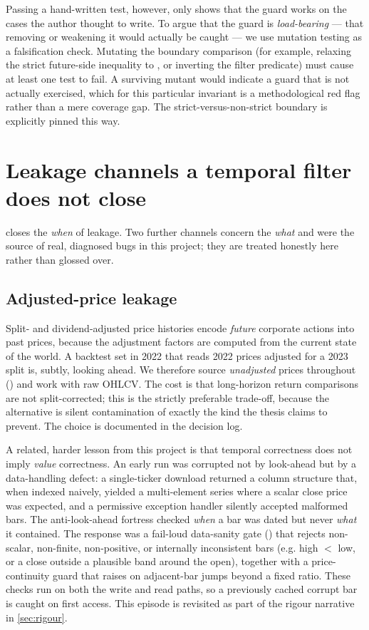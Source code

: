 Passing a hand-written test, however, only shows that the guard works on the cases the
author thought to write. To argue that the guard is \emph{load-bearing} --- that removing or
weakening it would actually be caught --- we use mutation testing as a falsification check.
Mutating the boundary comparison (for example, relaxing the strict future-side inequality
\code{>} to \code{>=}, or inverting the filter predicate) must cause at least one test to
fail. A surviving mutant would indicate a guard that is not actually exercised, which for
this particular invariant is a methodological red flag rather than a mere coverage gap. The
strict-versus-non-strict boundary is explicitly pinned this way.

\section{Leakage channels a temporal filter does not close}
\label{sec:leakage}

 closes the \emph{when} of leakage. Two further channels concern the
\emph{what} and were the source of real, diagnosed bugs in this project; they are treated
honestly here rather than glossed over.

\subsection{Adjusted-price leakage}

Split- and dividend-adjusted price histories encode \emph{future} corporate actions into
past prices, because the adjustment factors are computed from the current state of the
world. A backtest set in 2022 that reads 2022 prices adjusted for a 2023 split is, subtly,
looking ahead. We therefore source \emph{unadjusted} prices throughout
() and work with raw OHLCV. The cost is that long-horizon return
comparisons are not split-corrected; this is the strictly preferable trade-off, because the
alternative is silent contamination of exactly the kind the thesis claims to prevent. The
choice is documented in the decision log.

A related, harder lesson from this project is that temporal correctness does not imply
\emph{value} correctness. An early run was corrupted not by look-ahead but by a data-handling
defect: a single-ticker download returned a column structure that, when indexed naively,
yielded a multi-element series where a scalar close price was expected, and a permissive
exception handler silently accepted malformed bars. The anti-look-ahead fortress checked
\emph{when} a bar was dated but never \emph{what} it contained. The response was a
fail-loud data-sanity gate () that rejects non-scalar, non-finite,
non-positive, or internally inconsistent bars (e.g. high $<$ low, or a close outside a
plausible band around the open), together with a price-continuity guard that raises on
adjacent-bar jumps beyond a fixed ratio. These checks run on both the write and read paths,
so a previously cached corrupt bar is caught on first access. This episode is revisited as
part of the rigour narrative in \cref{sec:rigour}.

